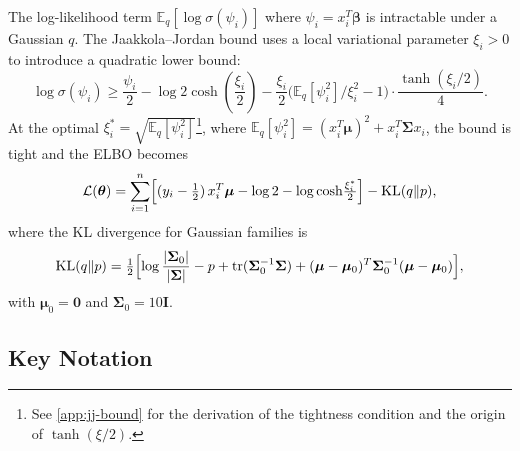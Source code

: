 \documentclass[11pt,a4paper]{article}
\newcommand{\E}{\mathbb{E}}
\newcommand{\tr}{\text{tr}}
\begin{document}
The log-likelihood term $\E_q[\log\sigma(\psi_i)]$ where $\psi_i = x_i^T\bm{\beta}$
is intractable under a Gaussian $q$.
The Jaakkola--Jordan bound uses a local variational parameter $\xi_i > 0$ to introduce
a quadratic lower bound:
\begin{equation}
  \log\sigma(\psi_i) \geq \frac{\psi_i}{2} - \log 2\cosh\!\left(\frac{\xi_i}{2}\right)
  - \frac{\xi_i}{2}\bigl(\E_q[\psi_i^2]/\xi_i^2 - 1\bigr) \cdot \frac{\tanh(\xi_i/2)}{4}.
\end{equation}
At the optimal $\xi_i^* = \sqrt{\E_q[\psi_i^2]}$\footnote{See \ref{app:jj-bound} for the derivation of the tightness condition and the origin of $\tanh(\xi/2)$.}, where
$\E_q[\psi_i^2] = (x_i^T\bm{\mu})^2 + x_i^T\bm{\Sigma} x_i$,
the bound is tight and the ELBO becomes
\begin{equation}\label{eq:elbo}
  \mathcal{L}(\bm{\theta}) = \sum_{i=1}^{n}
  \Bigl[(y_i - \tfrac{1}{2})\,x_i^T\bm{\mu}
        - \log 2 - \log\cosh\!\tfrac{\xi_i^*}{2}\Bigr]
  - \mathrm{KL}(q\|p),
\end{equation}
where the KL divergence for Gaussian families is
\begin{equation}
  \mathrm{KL}(q\|p) = \tfrac{1}{2}\Bigl[
    \log\frac{|\bm{\Sigma}_0|}{|\bm{\Sigma}|}
    - p + \tr(\bm{\Sigma}_0^{-1}\bm{\Sigma})
    + (\bm{\mu}-\bm{\mu}_0)^T\bm{\Sigma}_0^{-1}(\bm{\mu}-\bm{\mu}_0)
  \Bigr],
\end{equation}
with $\bm{\mu}_0=\bm{0}$ and $\bm{\Sigma}_0 = 10\bm{I}$.

\subsection{Key Notation}
\end{document}
